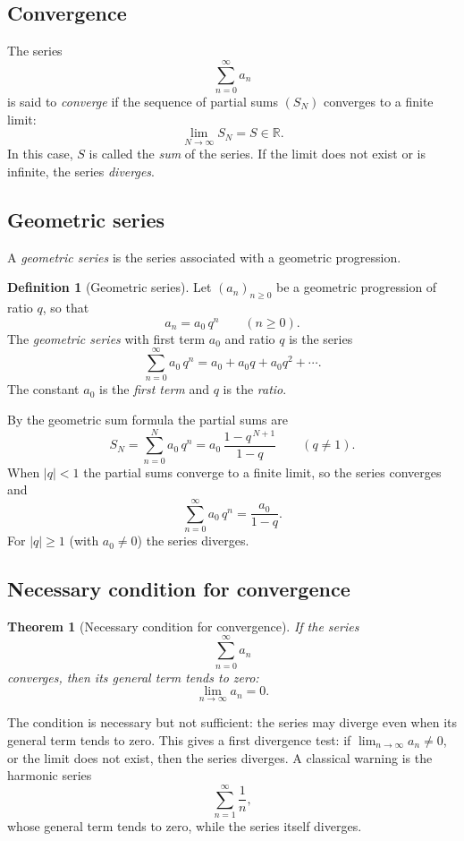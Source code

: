 \documentclass[11pt,a4paper]{article}
\theoremstyle{definition} \newtheorem{definition}{Definition} \theoremstyle{plain} \newtheorem{theorem}{Theorem}
\begin{document}
\subsection{Convergence}
The series
\[ \sum_{n=0}^{\infty} a_n \]
is said to \emph{converge} if the sequence of partial sums $(S_N)$ converges to a finite limit:
\[ \lim_{N\to\infty} S_N = S \in \mathbb{R}. \]
In this case, $S$ is called the \emph{sum} of the series.
If the limit does not exist or is infinite, the series \emph{diverges}.
\subsection{Geometric series}
A \emph{geometric series} is the series associated with a geometric progression.
\begin{definition}[Geometric series] Let $(a_n)_{n\ge 0}$ be a geometric progression of ratio $q$, so that
\[ a_n = a_0\, q^n \qquad (n\ge 0). \]
The \emph{geometric series} with first term $a_0$ and ratio $q$ is the series
\[ \sum_{n=0}^{\infty} a_0\, q^n = a_0 + a_0q + a_0 q^2 + \cdots . \]
The constant $a_0$ is the \emph{first term} and $q$ is the \emph{ratio}. \end{definition}
By the geometric sum formula the partial sums are
\[ S_N = \sum_{n=0}^{N} a_0\, q^n
= a_0\,\frac{1 - q^{\,N+1}}{1 - q}
\qquad (q\neq 1). \]
When $|q|<1$ the partial sums converge to a finite limit, so the series converges and
\[ \sum_{n=0}^{\infty} a_0\, q^n = \frac{a_0}{1-q}. \]
For $|q|\ge 1$ (with $a_0\neq 0$) the series diverges.
\subsection{Necessary condition for convergence}
\begin{theorem}[Necessary condition for convergence]\label{thm:necessary-convergence} If the series
\[ \sum_{n=0}^{\infty} a_n \]
converges, then its general term tends to zero:
\[ \lim_{n\to\infty} a_n = 0. \]
\end{theorem}
The condition is necessary but not sufficient: the series may diverge even when its general term tends to zero.
This gives a first divergence test: if $\lim_{n\to\infty} a_n\neq 0$, or the limit does not exist, then the series diverges.
A classical warning is the harmonic series
\[ \sum_{n=1}^{\infty} \frac{1}{n}, \]
whose general term tends to zero, while the series itself diverges.
\end{document}

